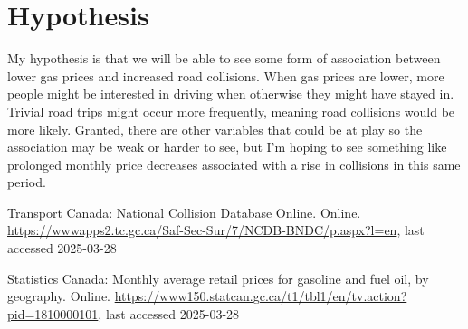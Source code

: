 \documentclass[runningheads]{llncs}
\begin{document}
\section{Hypothesis}
My hypothesis is that we will be able to see some form of association between lower gas prices and increased road collisions. When gas prices are lower, more people might be interested in driving when otherwise they might have stayed in. Trivial road trips might occur more frequently, meaning road collisions would be more likely. Granted, there are other variables that could be at play so the association may be weak or harder to see, but I'm hoping to see something like prolonged monthly price decreases associated with a rise in collisions in this same period. 
%
%
%
% 
% 
%
\begin{thebibliography}{8}
Transport Canada: National Collision Database Online. Online. \url{https://wwwapps2.tc.gc.ca/Saf-Sec-Sur/7/NCDB-BNDC/p.aspx?l=en}, last accessed 2025-03-28

Statistics Canada: Monthly average retail prices for gasoline and fuel oil, by geography. Online. \url{https://www150.statcan.gc.ca/t1/tbl1/en/tv.action?pid=1810000101}, last accessed 2025-03-28
\end{thebibliography}
\end{document}
